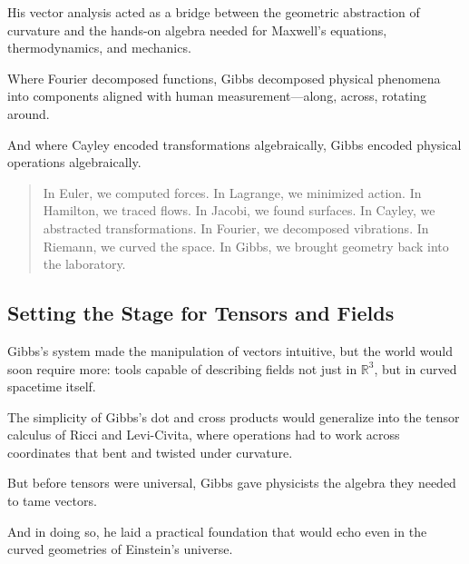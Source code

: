 His vector analysis acted as a bridge between the geometric abstraction of curvature  
and the hands-on algebra needed for Maxwell’s equations, thermodynamics, and mechanics.

Where Fourier decomposed functions, Gibbs decomposed physical phenomena into components aligned with human measurement—along, across, rotating around.

And where Cayley encoded transformations algebraically, Gibbs encoded physical operations algebraically.

\bigskip

\begin{quote}
In Euler, we computed forces.  
In Lagrange, we minimized action.  
In Hamilton, we traced flows.  
In Jacobi, we found surfaces.  
In Cayley, we abstracted transformations.  
In Fourier, we decomposed vibrations.  
In Riemann, we curved the space.  
In Gibbs, we brought geometry back into the laboratory.
\end{quote}

\subsection*{Setting the Stage for Tensors and Fields}

Gibbs’s system made the manipulation of vectors intuitive,  
but the world would soon require more:  
tools capable of describing fields not just in \( \mathbb{R}^3 \), but in curved spacetime itself.

The simplicity of Gibbs’s dot and cross products would generalize into the tensor calculus of Ricci and Levi-Civita,  
where operations had to work across coordinates that bent and twisted under curvature.

But before tensors were universal, Gibbs gave physicists the algebra they needed to tame vectors.

And in doing so, he laid a practical foundation that would echo even in the curved geometries of Einstein’s universe.

